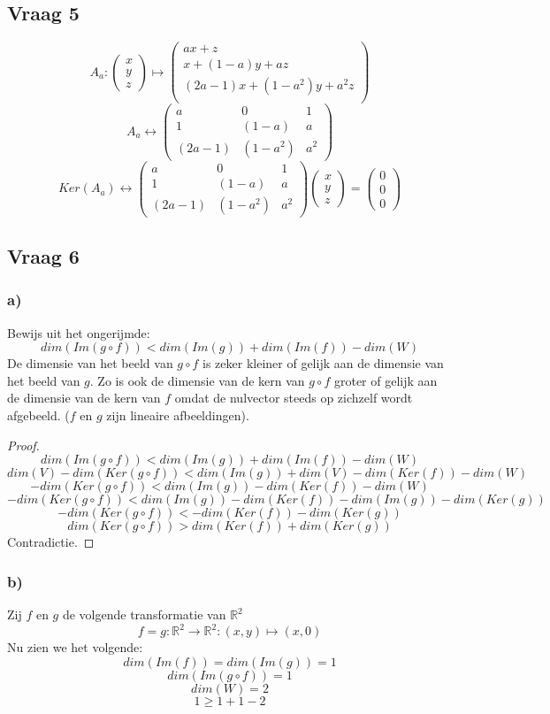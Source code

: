 \documentclass[lineaire_algebra_oplossingen.tex]{subfiles}
\begin{document}
\subsection{Vraag 5}
\[
A_a:
\begin{pmatrix}
x\\y\\z
\end{pmatrix}
\mapsto
\begin{pmatrix}
ax+z\\
x+(1-a)y+az\\
(2a-1)x+(1-a^2)y+a^2z\\
\end{pmatrix}
\]
\[
A_a \leftrightarrow
\begin{pmatrix}
a & 0 & 1\\
1 & (1-a) & a\\
(2a-1) & (1-a^2) & a^2
\end{pmatrix}
\]
\[
Ker(A_a) \leftrightarrow
\begin{pmatrix}
a & 0 & 1\\
1 & (1-a) & a\\
(2a-1) & (1-a^2) & a^2
\end{pmatrix}
\begin{pmatrix}
x\\y\\z
\end{pmatrix}
=
\begin{pmatrix}
0\\0\\0
\end{pmatrix}
\]

\subsection{Vraag 6}
\subsubsection*{a)}
Bewijs uit het ongerijmde:
\[
dim(Im(g\circ f)) < dim(Im(g)) + dim(Im(f)) - dim(W)
\]
De dimensie van het beeld van $g \circ f$ is zeker kleiner of gelijk aan de dimensie van het beeld van $g$. Zo is ook de dimensie van de kern van $g \circ f$ groter of gelijk aan de dimensie van de kern van $f$ omdat de nulvector steeds op zichzelf wordt afgebeeld. ($f$ en $g$ zijn lineaire afbeeldingen).
\begin{proof}
\[
dim(Im(g\circ f)) < dim(Im(g)) + dim(Im(f)) - dim(W)
\]
\[
dim(V) - dim(Ker(g\circ f)) < dim(Im(g)) + dim(V) - dim(Ker(f)) - dim(W)
\]
\[
-dim(Ker(g\circ f)) < dim(Im(g)) - dim(Ker(f)) - dim(W)
\]
\[
-dim(Ker(g\circ f)) < dim(Im(g)) - dim(Ker(f)) - dim(Im(g)) - dim(Ker(g))
\]
\[
-dim(Ker(g\circ f)) < - dim(Ker(f)) - dim(Ker(g))
\]
\[
dim(Ker(g\circ f)) > dim(Ker(f)) + dim(Ker(g))
\]
Contradictie.
\end{proof}

\subsubsection*{b)}
Zij $f$ en $g$ de volgende transformatie van $\mathbb{R}^2$
\[
f = g : \mathbb{R}^2 \rightarrow \mathbb{R}^2: (x,y) \mapsto (x,0)
\]
Nu zien we het volgende:
\[
dim(Im(f)) = dim(Im(g)) = 1
\]
\[
dim(Im(g\circ f)) = 1
\]
\[
dim(W) = 2
\]
\[
1 \ge 1 + 1 - 2
\]
\end{document}
